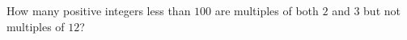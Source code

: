 How many positive integers less than $100$ are multiples of both $2$ and $3$ but not multiples of $12$?
